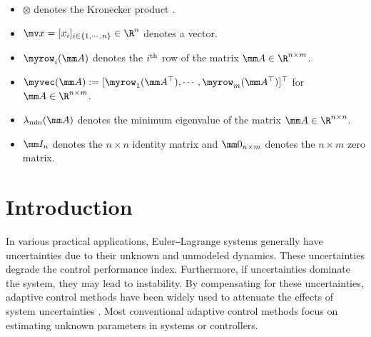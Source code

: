 \documentclass[letterpaper, 10 pt, conference]{ieeeconf}  %
\begin{document}
\begin{itemize}
    \item $\otimes$ denotes the Kronecker product \cite[Definition 7.1.2]{Bernstein:2009aa}.
    \item $\mv x=[x_i]_{i\in\{1,\cdots,n\}}\in\R^n$ denotes a vector.
    \item $\myrow_i(\mm A)$ denotes the $i\textsuperscript{th}$ row of the matrix $\mm A\in\R^{n\times m}$. 
    \item $\myvec(\mm A):= [\myrow_1(\mm A^\top)  ,\cdots,\myrow_m(\mm A^\top)  ]^\top   $ for $\mm A\in\R^{n\times m}$.
    \item $\lambda_\text{min}(\mm A)$ denotes the minimum eigenvalue of the matrix $\mm A\in\R^{n\times n}$.
    \item $\mm I_n$ denotes the $n\times n$ identity matrix and $\mm 0_{n\times m}$ denotes the $n\times m$ zero matrix.
\end{itemize}

\section{Introduction} \label{sec:intro}

In various practical applications, Euler‒Lagrange systems generally have uncertainties due to their unknown and unmodeled dynamics.
These uncertainties degrade the control performance index.
Furthermore, if uncertainties dominate the system, they may lead to instability.
By compensating for these uncertainties, adaptive control methods have been widely used to attenuate the effects of system uncertainties \cite{Tao:2003aa,Ioannou:2006aa}.
Most conventional adaptive control methods focus on estimating unknown parameters in systems or controllers.
\end{document}
